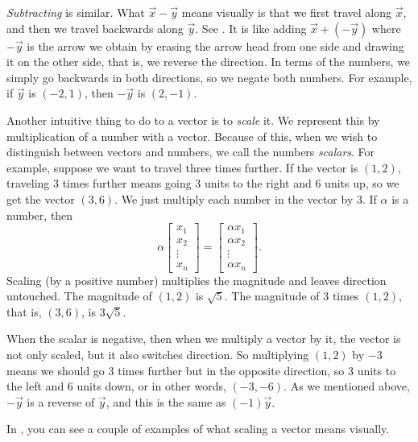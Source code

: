 \documentclass{ximera}
\begin{document}
\emph{Subtracting} is similar. What $\vec{x}- \vec{y}$ means visually is that we first travel along $\vec{x}$, and then we travel backwards along $\vec{y}$. See . It is like adding $\vec{x}+ (- \vec{y})$ where $-\vec{y}$ is the arrow we obtain by erasing the arrow head from one side and drawing it on the other side, that is, we reverse the direction.  In terms of the numbers, we simply go backwards in both directions, so we negate both numbers.  For example, if $\vec{y}$ is $(-2,1)$, then $-\vec{y}$ is $(2,-1)$.

Another intuitive thing to do to a vector is to \emph{scale} it. We represent this by multiplication of a number with a vector. Because of this, when we wish to distinguish between vectors and numbers, we call the numbers \emph{scalars}. For example, suppose we want to travel three times further.  If the vector is $(1,2)$, traveling 3 times further means going 3 units to the right and 6 units up, so we get the vector $(3,6)$. We just multiply each number in the vector by 3. If $\alpha$ is a number, then 
\begin{equation*}
    \alpha
    \begin{bmatrix}
        x_{1} \\ x_2 \\ \vdots \\ x_n
    \end{bmatrix} =
    \begin{bmatrix}
        \alpha x_{1} \\ \alpha x_2 \\ \vdots \\ \alpha x_n
    \end{bmatrix} .
\end{equation*}
Scaling (by a positive number) multiplies the magnitude and leaves direction untouched. The magnitude of $(1,2)$ is $\sqrt{5}$.  The magnitude of 3 times $(1,2)$, that is, $(3,6)$, is $3\sqrt{5}$.

When the scalar is negative, then when we multiply a vector by it, the vector is not only scaled, but it also switches direction. So multiplying $(1,2)$ by $-3$ means we should go 3 times further but in the opposite direction, so 3 units to the left and 6 units down, or in other words, $(-3,-6)$.  As we mentioned above, $-\vec{y}$ is a reverse of $\vec{y}$, and this is the same as $(-1)\vec{y}$.

In , you can see a couple of examples of what scaling a vector means visually.
\end{document}
